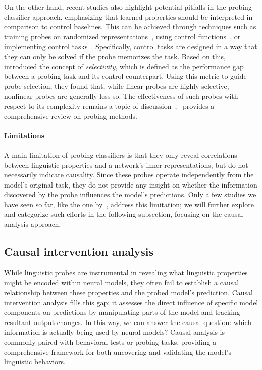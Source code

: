 On the other hand, recent studies also highlight potential pitfalls in the probing classifier approach, emphasizing that learned properties should be interpreted in comparison to control baselines. This can be achieved through techniques such as training probes on randomized representations~\citep{conneau-etal-2018-cram,tenney2019you}, using control functions~\citep{hall-maudslay-etal-2020-tale}, or implementing control tasks~\citep{hewitt-liang-2019-designing,ravichander-etal-2021-probing}. Specifically, control tasks are designed in a way that they can only be solved if the probe memorizes the task. Based on this, \cite{hewitt-liang-2019-designing} introduced the concept of \textit{selectivity}, which is defined as the performance gap between a probing task and its control counterpart. Using this metric to guide probe selection, they found that, while linear probes are highly selective, nonlinear probes are generally less so. The effectiveness of such probes with respect to its complexity remains a topic of discussion~\citep{hall-maudslay-etal-2020-tale,ravichander-etal-2021-probing},~\cite{belinkov-2022-probing} provides a comprehensive review on probing methods. 


\paragraph{Limitations} A main limitation of probing classifiers is that they only reveal correlations between linguistic properties and a network's inner representations, but do not necessarily indicate causality. Since these probes operate independently from the model's original task, they do not provide any insight on whether the information discovered by the probe influences the model's predictions. Only a few studies we have seen so far, like the one by~\cite{giulianelli-etal-2018-hood}, address this limitation; we will further explore and categorize such efforts in the following subsection, focusing on the causal analysis approach.


\subsection{Causal intervention analysis} \label{sec:sota_causal_approaches}

While linguistic probes are instrumental in revealing what linguistic properties might be encoded within neural models, they often fail to establish a causal relationship between these properties and the probed model's prediction. Causal intervention analysis fills this gap: it assesses the direct influence of specific model components on predictions by manipulating parts of the model and tracking resultant output changes. In this way, we can answer the causal question: which information is actually being used by neural models? Causal analysis is commonly paired with behavioral tests or probing tasks, providing a comprehensive framework for both uncovering and validating the model's linguistic behaviors.

